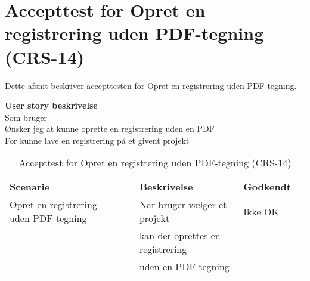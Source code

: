 \section{Accepttest for Opret en registrering uden PDF-tegning (CRS-14)}
Dette afsnit beskriver accepttesten for Opret en registrering uden PDF-tegning.

\textbf{User story beskrivelse} \\
Som bruger \\
Ønsker jeg at kunne oprette en registrering uden en PDF  \\
For kunne lave en registrering på et givent projekt

\begin{table}[H]
	\centering
	\begin{tabular}{|ll|l|ll|} \hline
		\textbf{Scenarie} &  & \textbf{Beskrivelse}&  \textbf{Godkendt}&  \\ \hline
		Opret en registrering uden PDF-tegning&  &  Når bruger vælger et projekt &  Ikke OK&  \\
		& & kan der oprettes en registrering& & \\ 
			& & uden en PDF-tegning& & \\ \hline
	\end{tabular}
	\caption{Accepttest for Opret en registrering uden PDF-tegning (CRS-14)}
	\label{AcceptUdenPDF}
\end{table}

\clearpage
